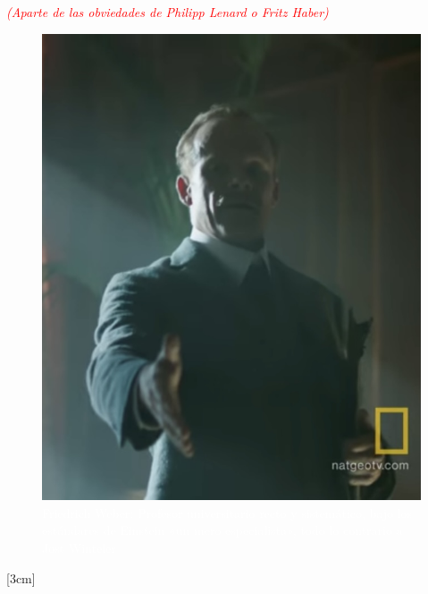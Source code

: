 \documentclass{article}
\begin{document}
\vspace{5cm}

\textcolor{Red}{\emph{(Aparte de las obviedades de Philipp Lenard o Fritz Haber)}}

\begin{figure}

\includegraphics[scale=0.12, angle=8]{Friedrich_Weber.jpeg}
\caption{\textcolor{White}{Friedrich Weber: Profesor universitario recto y sistemático, bajo los estándares de Einstein «un mero especialista», todo lo contrario a Jost Winteler}}

\end{figure}

\vspace{-10cm}

[3cm]

\fancyfoot[L]{}
\end{document}
